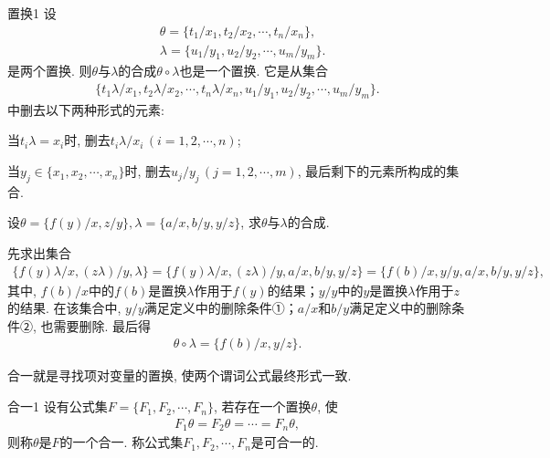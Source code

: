 \begin{mydef}{置换}{1}
设
\begin{align}
    &\theta =\{t_1/x_1,t_2/x_2,\cdots,t_n/x_n\},\\
    &\lambda =\{u_1/y_1, u_2/y_2, \cdots , u_m/y_m \}.
\end{align}
是两个置换. 则$\theta$与$\lambda$的合成$\theta \circ \lambda$也是一个置换. 它是从集合
\begin{align}
  \{ t_1\lambda /x_1, t_2\lambda /x_2, \cdots , t_n\lambda /x_n,  u_1/y_1, u_2/y_2, \cdots , u_m/y_m \}.
\end{align}
中删去以下两种形式的元素:

        当$t_i\lambda =x_i$时, 删去$t_i\lambda /x_i\, (i=1, 2 ,\cdots, n)$;

        当$y_j\in \{ x_1, x_2 ,\cdots, x_n\}时$, 删去$u_j/y_j\, (j=1, 2 ,\cdots, m)$, 最后剩下的元素所构成的集合.
\end{mydef}
\begin{example}
    设$\theta =\{ f(y)/x, z/y \}, \lambda =\{a/x, b/y ,y/z \}$, 求$\theta $与$\lambda $的合成.
\end{example}
\begin{result}
    先求出集合
\begin{align}
  \{f(y)\lambda/x, (z\lambda)/y, \lambda\}=\{f(y)\lambda/x, (z\lambda)/y,a/x, b/y , y/z\}=\{f(b)/x, y/y, a/x, b/y , y/z\},
\end{align}
其中, $f(b)/x$中的$f(b)$是置换$\lambda$作用于$f(y)$的结果；$y/y$中的$y$是置换$\lambda$作用于$z$的结果. 在该集合中, $y/y$满足定义中的删除条件①；$a/x$和$b/y$满足定义中的删除条件②, 也需要删除. 最后得
\begin{align}
  \theta \circ \lambda =\{f(b)/x, y/z\}.
\end{align}
\end{result}
\begin{remark}
    合一就是寻找项对变量的置换, 使两个谓词公式最终形式一致.
\end{remark}

\begin{mydef}{合一}{1}
设有公式集$F=\{F_1, F_2,\cdots,F_n\}$, 若存在一个置换$\theta$, 使
\begin{align}
  F_1\theta =F_2\theta =\cdots=F_n\theta ,
\end{align}
则称$\theta$是$F$的一个合一. 称公式集$F_1,F_2,\cdots,F_n$是可合一的.
\end{mydef}

